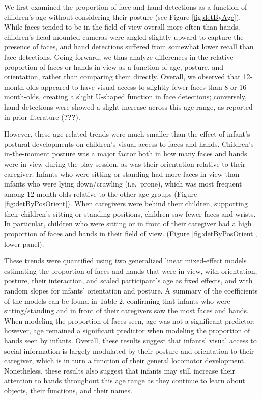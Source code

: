 \documentclass[english,man,floatsintext,draftall]{apa6}
\begin{document}
We first examined the proportion of face and hand detections as a
function of children's age without considering their posture (see Figure
\ref{fig:detByAge}). While faces tended to be in the field-of-view
overall more often than hands, children's head-mounted cameras were
angled slightly upward to capture the presence of faces, and hand
detections suffered from somewhat lower recall than face detections.
Going forward, we thus analyze differences in the relative proportion of
faces or hands in view as a function of age, posture, and orientation,
rather than comparing them directly. Overall, we observed that
12-month-olds appeared to have visual access to slightly fewer faces
than 8 or 16-month-olds, creating a slight U-shaped function in face
detections; conversely, hand detections were showed a slight increase
across this age range, as reported in prior literature ({\textbf{???}}).

However, these age-related trends were much smaller than the effect of
infant's postural developments on children's visual access to faces and
hands. Children's in-the-moment posture was a major factor both in how
many faces and hands were in view during the play session, as was their
orientation relative to their caregiver. Infants who were sitting or
standing had more faces in view than infants who were lying
down/crawling (i.e.~prone), which was most frequent among 12-month-olds
relative to the other age groups (Figure \ref{fig:detByPosOrient}). When
caregivers were behind their children, supporting their children's
sitting or standing positions, children saw fewer faces and wrists. In
particular, children who were sitting or in front of their caregiver had
a high proportion of faces and hands in their field of view. (Figure
\ref{fig:detByPosOrient}, lower panel).

These trends were quantified using two generalized linear mixed-effect
models estimating the proportion of faces and hands that were in view,
with orientation, posture, their interaction, and scaled participant's
age as fixed effects, and with random slopes for infants' orientation
and posture. A summary of the coefficients of the models can be found in
Table 2, confirming that infants who were sitting/standing and in front
of their caregivers saw the most faces and hands. When modeling the
proportion of faces seen, age was not a significant predictor; however,
age remained a significant predictor when modeling the proportion of
hands seen by infants. Overall, these results suggest that infants'
visual access to social information is largely modulated by their
posture and orientation to their caregiver, which is in turn a function
of their general locomotor development. Nonetheless, these results also
suggest that infants may still increase their attention to hands
throughout this age range as they continue to learn about objects, their
functions, and their names.
\end{document}
